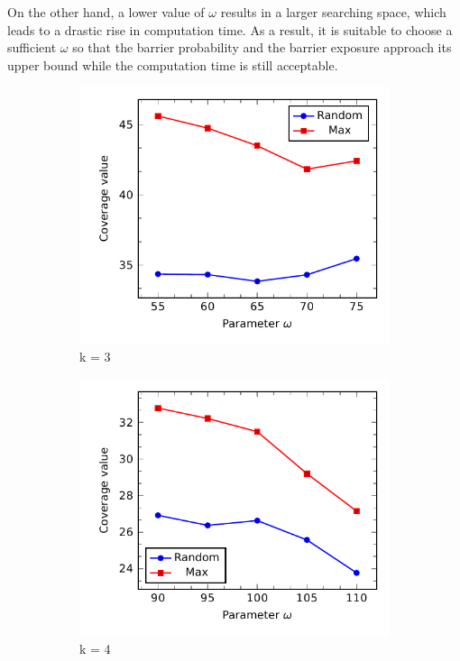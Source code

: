 On the other hand, a lower value of $\omega$ results in a larger searching space, which leads to a drastic rise in computation time. As a result, it is suitable to choose a sufficient $\omega$ so that the barrier probability and the barrier exposure approach its upper bound while the computation time is still acceptable.

\begin{figure}[h]
	\begin{subfigure}[t]{.5\textwidth}
		\centering
		\includegraphics[scale=.8]{Hinhanh/OmegaEffect/coverage/k4.pdf}
		\caption{k = 3}
	\end{subfigure}
	\begin{subfigure}[t]{.5\textwidth}
		\centering
		\includegraphics[scale=.8]{Hinhanh/OmegaEffect/coverage/k3.pdf}		
		\caption{k = 4}
	\end{subfigure}
\caption{}
\label{fig:}
\end{figure}

